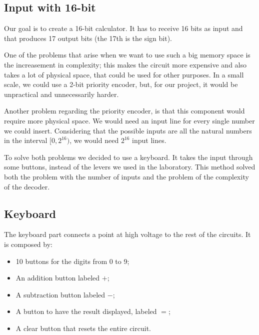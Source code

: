 \documentclass{article}
\begin{document}
\subsection{Input with 16-bit}

Our goal is to create a 16-bit calculator. It has to receive 16 bits as input and that produces 17 output bits (the 17th is the sign bit).

\vspace{3mm}

One of the problems that arise when we want to use such a big memory space is the increasement in complexity; this makes the circuit more expensive and also takes a lot of physical space, that could be used for other purposes. In a small scale, we could use a 2-bit priority encoder, but, for our project, it would be unpractical and unnecessarily harder.

\vspace{3mm}

Another problem regarding the priority encoder, is that this component would require more physical space. We would need an input line for every single number we could insert. Considering that the possible inputs are all the natural numbers in the interval $[0,2^{16})$, we would need $2^{16}$ input lines.

\vspace{3mm}

To solve both problems we decided to use a keyboard. It takes the input through some buttons, instead of the levers we used in the laboratory. This method solved both the problem with the number of inputs and the problem of the complexity of the decoder.



\subsection{Keyboard}

The keyboard part connects a point at high voltage to the rest of the circuits. It is composed by: 

\begin{itemize}
    \item 10 buttons for the digits from 0 to 9;
    \item An addition button labeled $+$;
    \item A subtraction button labeled $-$;
    \item A button to have the result displayed, labeled $=$;
    \item A clear button that resets the entire circuit.
\end{itemize}
\end{document}
